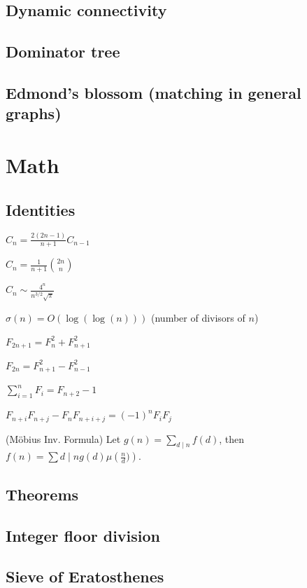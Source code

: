 \subsection{Dynamic connectivity}
\subsection{Dominator tree}
\subsection{Edmond's blossom (matching in general graphs)}

\section{Math}
\subsection{Identities}
{
	$C_n = \frac{2(2n-1)}{n+1} C_{n-1}$

	$C_n = \frac{1}{n+1} \binom{2n}{n}$

	$C_n \sim \frac{4^n}{n^{3/2}\sqrt{\pi}}$

	$\sigma(n) = O(\log(\log(n)))$ (number of divisors of $n$)

	$F_{2n+1} = F_{n}^2 + F_{n+1}^2$

	$F_{2n} = F_{n+1}^2 - F_{n-1}^2$

	$\sum_{i=1}^n F_i = F_{n+2}-1$

	$F_{n+i}F_{n+j} - F_nF_{n+i+j} = (-1)^n F_iF_j$

	(Möbius Inv. Formula)
	Let $g(n) = \sum_{d\mid n} f(d)$, then $f(n)=\sum{d\mid n} g(d) \mu\left(\frac{n}{d})\right)$.
}
\subsection{Theorems}
\subsection{Integer floor division}
\subsection{Sieve of Eratosthenes}
